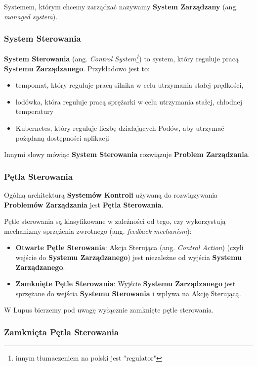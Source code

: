 Systemem, którym chcemy zarządzać nazywamy \textbf{System Zarządzany} (ang. \textit{managed system}). 

\subsubsection{System Sterowania}

\textbf{System Sterowania} (ang. \textit{Control System\footnote{innym tłumaczeniem na polski jest "regulator"}}) to system, który reguluje pracą \textbf{Systemu Zarządzanego}. Przykładowo jest to:
\begin{itemize}
    \item tempomat, który reguluje pracą silnika w celu utrzymania stałej prędkości,
    \item lodówka, która reguluje pracą sprężarki w celu utrzymania stałej, chłodnej temperatury
    \item Kubernetes, który reguluje liczbę działających Podów, aby utrzymać pożądaną dostępności aplikacji
\end{itemize}

Innymi słowy mówiąc \textbf{System Sterowania} rozwiązuje \textbf{Problem Zarządzania}.

\subsubsection{Pętla Sterowania}

Ogólną architekturą \textbf{Systemów Kontroli} używaną do rozwiązywania \textbf{Problemów Zarządzania} jest \textbf{Pętla Sterowania}.

Pętle sterowania są klasyfikowane w zależności od tego, czy wykorzystują mechanizmy sprzężenia zwrotnego (ang. \textit{feedback mechanism}):
\begin{itemize}
    \item \textbf{Otwarte Pętle Sterowania}: Akcja Sterująca (ang. \textit{Control Action}) (czyli wejście do \textbf{Systemu Zarządzanego}) jest niezależne od wyjścia \textbf{Systemu Zarządzanego}.
    \item \textbf{Zamknięte Pętle Sterowania}: Wyjście \textbf{Systemu Zarządzanego} jest sprzężane do wejścia \textbf{Systemu Sterowania} i wpływa na Akcję Sterującą. 
\end{itemize}

W Lupus bierzemy pod uwagę wyłącznie zamknięte pętle sterowania.

\subsubsection{Zamknięta Pętla Sterowania}


